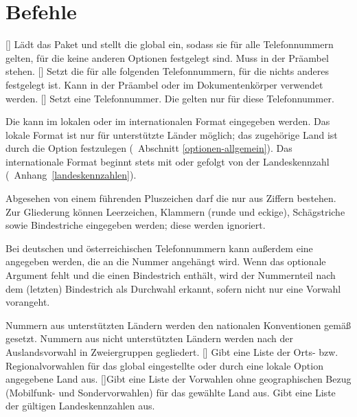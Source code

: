 \documentclass[numbers=noenddot]{scrreprt}
\newcommand*{\vglAbschnitt}[1]{(\cf\ Abschnitt \ref{#1})}
\newcommand*{\vglAnhang}[1]{(\cf\ Anhang~\ref{#1})}
\begin{document}
\section{Befehle}
\begin{Befehlsliste}
[]
Lädt das Paket und stellt die  global ein, sodass sie für alle Telefonnummern gelten, für die keine anderen Optionen festgelegt sind. Muss in der Präambel stehen.
[]
Setzt die  für alle folgenden Telefonnummern, für die nichts anderes festgelegt ist. Kann in der Präambel oder im Dokumentenkörper verwendet werden.
[]
Setzt eine Telefonnummer. Die  gelten nur für diese Telefonnummer.

Die  kann im lokalen oder im internationalen Format eingegeben werden. Das lokale Format ist nur für unterstützte Länder möglich; das zugehörige Land ist durch die Option
festzulegen
\vglAbschnitt{optionen-allgemein}.
Das internationale Format beginnt stets mit
\code{+}
oder
gefolgt von der Landeskennzahl
\vglAnhang{landeskennzahlen}.

Abgesehen von einem führenden Pluszeichen darf die  nur aus Ziffern bestehen. Zur Gliederung können Leerzeichen, Klammern (runde und eckige), Schägstriche sowie Bindestriche eingegeben werden; diese werden ignoriert.

Bei deutschen und österreichischen Telefonnummern kann außerdem eine  angegeben werden, die an die Nummer angehängt wird. Wenn das optionale Argument fehlt und die  einen Bindestrich enthält, wird der Nummernteil nach dem (letzten) Bindestrich als Durchwahl erkannt, sofern nicht nur eine Vorwahl vorangeht.

Nummern aus unterstützten Ländern werden den nationalen Konventionen gemäß gesetzt. Nummern aus nicht unterstützten Ländern werden nach der Auslandsvorwahl in Zweiergruppen gegliedert.
[]
Gibt eine Liste der Orts- bzw. Regionalvorwahlen für das global eingestellte oder durch eine lokale Option angegebene Land aus.
[]{Gibt eine Liste der Vorwahlen ohne geographischen Bezug (Mobilfunk- und Sondervorwahlen) für das gewählte Land aus.}
Gibt eine Liste der gültigen Landeskennzahlen aus.
\end{Befehlsliste}
\end{document}
